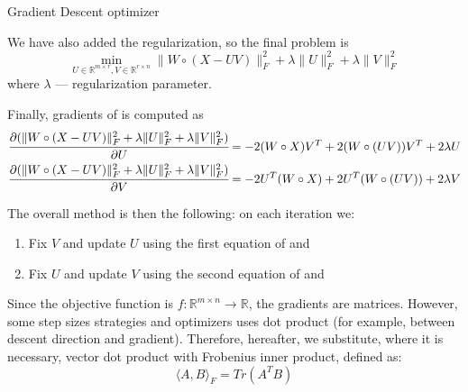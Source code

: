 \documentclass{article}
\def\R{\mathbb{R}}
\begin{document}
\begin{algorithm}[H]
  \caption{Gradient Descent optimizer}\label{algo:gd}
  \begin{algorithmic}[0]

     
    \EndFor{}


  \end{algorithmic}
\end{algorithm}

We have also added the regularization, so the final problem is
\begin{equation}\label{eq:problem_reg}
  \min_{U \in \R^{m \times r}, V \in \R^{r \times n}} \|W \circ (X - UV)\|^2_F + \lambda\|U\|^2_F + \lambda\|V\|^2_F
\end{equation}
where $\lambda$ --- regularization parameter.

Finally, gradients of  is computed as
\begin{equation}\label{eq:grads_reg}
  \begin{aligned}
     & \cfrac{\partial (\|W \circ (X - UV)\|^2_F + \lambda\|U\|^2_F + \lambda\|V\|^2_F)}{\partial U} = -2 (W \circ X) V^T + 2 (W \circ (UV)) V^T + 2\lambda U \\
     & \cfrac{\partial (\|W \circ (X - UV)\|^2_F + \lambda\|U\|^2_F + \lambda\|V\|^2_F)}{\partial V} = -2 U^T (W \circ X) + 2 U^T (W \circ (UV)) + 2\lambda V \\
  \end{aligned}
\end{equation}

The overall method is then the following: on each iteration we:
\begin{enumerate}
  \item Fix $V$ and update $U$ using the first equation of  and 
  \item Fix $U$ and update $V$ using the second equation of  and 
\end{enumerate}

Since the objective function is $f : \R^{m \times n}  \rightarrow \R $, the gradients are  matrices.
However, some step sizes strategies and optimizers uses dot product (for example, between descent direction and gradient). Therefore, hereafter, we substitute, where it is necessary, vector dot product with Frobenius inner product, defined as:
\begin{equation}\label{eq:frob}
  \langle A, B \rangle_F = Tr (A^T B)
\end{equation}
\end{document}
